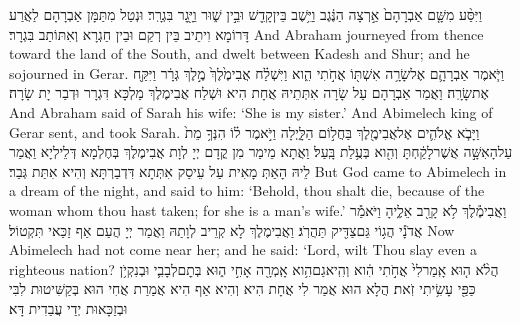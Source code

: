 \newperek
{}
{וַיִּסַּ֨ע מִשָּׁ֤ם אַבְרָהָם֙ אַ֣רְצָה הַנֶּ֔גֶב וַיֵּ֥שֶׁב בֵּין\maqqaf קָדֵ֖שׁ וּבֵ֣ין שׁ֑וּר וַיָּ֖גׇר בִּגְרָֽר׃}
{וּנְטַל מִתַּמָּן אַבְרָהָם לַאֲרַע דָּרוֹמָא וִיתֵיב בֵּין רְקַם וּבֵין חַגְרָא וְאִתּוֹתַב בִּגְרָר׃}
{And Abraham journeyed from thence toward the land of the South, and dwelt between Kadesh and Shur; and he sojourned in Gerar.}{}
{וַיֹּ֧אמֶר אַבְרָהָ֛ם אֶל\maqqaf שָׂרָ֥ה אִשְׁתּ֖וֹ אֲחֹ֣תִי הִ֑וא וַיִּשְׁלַ֗ח אֲבִימֶ֙לֶךְ֙ מֶ֣לֶךְ גְּרָ֔ר וַיִּקַּ֖ח אֶת\maqqaf שָׂרָֽה׃}
{וַאֲמַר אַבְרָהָם עַל שָׂרָה אִתְּתֵיהּ אֲחָת הִיא וּשְׁלַח אֲבִימֶלֶךְ מַלְכָּא דִּגְרָר וּדְבַר יָת שָׂרָה׃}
{And Abraham said of Sarah his wife: ‘She is my sister.’ And Abimelech king of Gerar sent, and took Sarah.}{}
{וַיָּבֹ֧א אֱלֹהִ֛ים אֶל\maqqaf אֲבִימֶ֖לֶךְ בַּחֲל֣וֹם הַלָּ֑יְלָה וַיֹּ֣אמֶר ל֗וֹ הִנְּךָ֥ מֵת֙ עַל\maqqaf הָאִשָּׁ֣ה אֲשֶׁר\maqqaf לָקַ֔חְתָּ וְהִ֖וא בְּעֻ֥לַת בָּֽעַל׃}
{וַאֲתָא מֵימַר מִן קֳדָם יְיָ לְוָת אֲבִימֶלֶךְ בְּחֶלְמָא דְּלֵילְיָא וַאֲמַר לֵיהּ הָאַתְּ מָאִית עַל עֵיסַק אִתְּתָא דִּדְבַרְתָּא וְהִיא אִתַּת גְּבַר׃}
{But God came to Abimelech in a dream of the night, and said to him: ‘Behold, thou shalt die, because of the woman whom thou hast taken; for she is a man’s wife.’}{}
{וַאֲבִימֶ֕לֶךְ לֹ֥א קָרַ֖ב אֵלֶ֑יהָ וַיֹּאמַ֕ר אֲדֹנָ֕י הֲג֥וֹי גַּם\maqqaf צַדִּ֖יק תַּהֲרֹֽג׃}
{וַאֲבִימֶלֶךְ לָא קְרֵיב לְוָתַהּ וַאֲמַר יְיָ הֲעַם אַף זַכַּאי תִּקְטוֹל׃}
{Now Abimelech had not come near her; and he said: ‘Lord, wilt Thou slay even a righteous nation?}{}
{הֲלֹ֨א ה֤וּא אָֽמַר\maqqaf לִי֙ אֲחֹ֣תִי הִ֔וא וְהִֽיא\maqqaf גַם\maqqaf הִ֥וא אָֽמְרָ֖ה אָחִ֣י ה֑וּא בְּתׇם\maqqaf לְבָבִ֛י וּבְנִקְיֹ֥ן כַּפַּ֖י עָשִׂ֥יתִי זֹֽאת׃}
{הֲלָא הוּא אֲמַר לִי אֲחָת הִיא וְהִיא אַף הִיא אֲמַרַת אֲחִי הוּא בְּקַשִּׁיטוּת לִבִּי וּבְזַכָּאוּת יְדַי עֲבַדִית דָּא׃}

